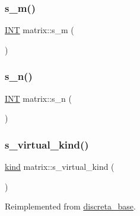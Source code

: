 \mbox{\label{classmatrix_afeb2e29600e68448b9d1130114b9606f}} 
\subsubsection{\texorpdfstring{s\+\_\+m()}{s\_m()}}
{\footnotesize\ttfamily \mbox{\hyperlink{galois_8h_a09fddde158a3a20bd2dcadb609de11dc}{I\+NT}} matrix\+::s\+\_\+m (\begin{DoxyParamCaption}{ }\end{DoxyParamCaption})}

\mbox{\label{classmatrix_a35f5321a5615451fdc8be7b953f8ac8b}} 
\subsubsection{\texorpdfstring{s\+\_\+n()}{s\_n()}}
{\footnotesize\ttfamily \mbox{\hyperlink{galois_8h_a09fddde158a3a20bd2dcadb609de11dc}{I\+NT}} matrix\+::s\+\_\+n (\begin{DoxyParamCaption}{ }\end{DoxyParamCaption})}

\mbox{\label{classmatrix_a4880cc2b5e8d3f8f2d8038580364db56}} 
\subsubsection{\texorpdfstring{s\+\_\+virtual\+\_\+kind()}{s\_virtual\_kind()}}
{\footnotesize\ttfamily \mbox{\hyperlink{discreta_8h_aaf25ee7e2306d78c74ec7bc48f092e81}{kind}} matrix\+::s\+\_\+virtual\+\_\+kind (\begin{DoxyParamCaption}{ }\end{DoxyParamCaption})\hspace{0.3cm}{\ttfamily [virtual]}}



Reimplemented from \mbox{\hyperlink{classdiscreta__base_a52778a6d6943a468be083d0785d418fb}{discreta\+\_\+base}}.

\mbox{\label{classmatrix_ae2ce1d7bc40998e94c67cc2336f47665}} 
